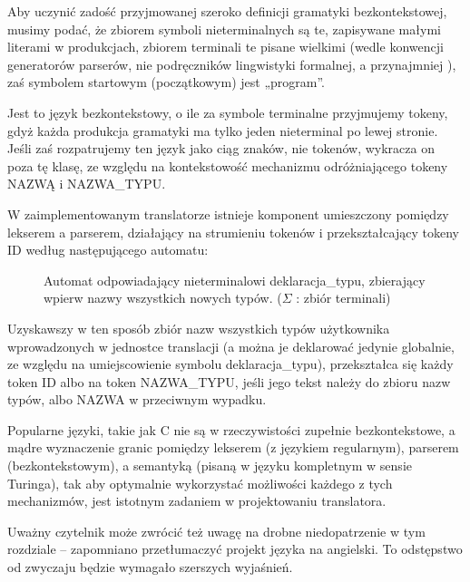 Aby uczynić zadość przyjmowanej szeroko definicji gramatyki bezkontekstowej\cite[str.~158]{hopcroft_automaty}, musimy podać, że zbiorem symboli nieterminalnych są te, zapisywane małymi literami w produkcjach, zbiorem terminali te pisane wielkimi (wedle konwencji generatorów parserów, nie podręczników lingwistyki formalnej, a przynajmniej \cite{hopcroft_automaty}), zaś symbolem startowym (początkowym) jest „program”. 

Jest to język bezkontekstowy, o ile za symbole terminalne przyjmujemy tokeny, gdyż każda produkcja gramatyki ma tylko jeden nieterminal po lewej stronie. Jeśli zaś rozpatrujemy ten język jako ciąg znaków, nie tokenów, wykracza on poza tę klasę, ze względu na kontekstowość mechanizmu odróżniającego tokeny NAZWĄ i NAZWA\_TYPU.

W zaimplementowanym translatorze istnieje komponent umieszczony pomiędzy lekserem a parserem, działający na strumieniu tokenów i przekształcający tokeny ID według następującego automatu:

\begin{figure}[h]
    \centering
    
    \caption{Automat odpowiadający nieterminalowi deklaracja\_typu, zbierający wpierw nazwy wszystkich nowych typów. ($\Sigma$ : zbiór terminali) }
\end{figure}
Uzyskawszy w ten sposób zbiór nazw wszystkich typów użytkownika wprowadzonych w jednostce translacji (a można je deklarować jedynie globalnie, ze względu na umiejscowienie symbolu deklaracja\_typu), przekształca się każdy token ID albo na token NAZWA\_TYPU, jeśli jego tekst należy do zbioru nazw typów, albo NAZWA w przeciwnym wypadku.

Popularne języki, takie jak C nie są w rzeczywistości zupełnie bezkontekstowe, a mądre wyznaczenie granic pomiędzy lekserem (z językiem regularnym), parserem (bezkontekstowym), a semantyką (pisaną w języku kompletnym w sensie Turinga), tak aby optymalnie wykorzystać możliwości każdego z tych mechanizmów, jest istotnym zadaniem w projektowaniu translatora\cite{DRAGON_BOOK}.

Uważny czytelnik może zwrócić też uwagę na drobne niedopatrzenie w tym rozdziale – zapomniano  przetłumaczyć projekt języka na angielski. To odstępstwo od zwyczaju będzie wymagało szerszych wyjaśnień.

